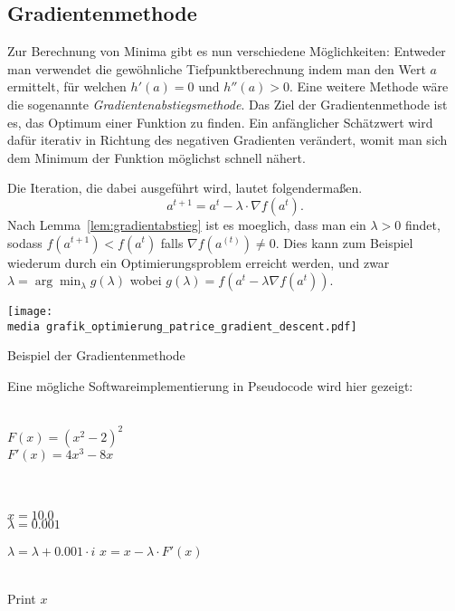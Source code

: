 \subsection{Gradientenmethode}

Zur Berechnung von Minima gibt es nun verschiedene Möglichkeiten:
Entweder man verwendet die gewöhnliche Tiefpunktberechnung indem man den Wert $a$ 
ermittelt, f\"ur welchen $h'(a)=0$ und $h''(a)>0$. 
Eine weitere Methode w\"are die sogenannte \emph{Gradientenabstiegsmethode}. Das Ziel der Gradientenmethode ist es, das Optimum einer Funktion zu finden. Ein anfänglicher Schätzwert wird dafür iterativ in Richtung des negativen Gradienten 
ver\"andert, womit man sich dem Minimum der Funktion möglichst schnell n\"ahert.

Die Iteration, die dabei ausgef\"uhrt wird, lautet folgenderma\ss en. 
\begin{equation*}
a^{t+1}  =a^{t} - \lambda \cdot \nabla  f(a^{t}).
\end{equation*}
Nach Lemma~\ref{lem:gradientabstieg} ist es moeglich, dass man ein $\lambda > 0$ findet, sodass $f(a^{t+1}) < f(a^{t})$ falls $ \nabla f(a^{(t)}) \neq 0$. 
Dies kann zum Beispiel wiederum durch ein Optimierungsproblem erreicht werden, und zwar $\lambda=\arg\min_{\lambda} g(\lambda)$ wobei $g(\lambda)=f(a^t-\lambda\nabla f(a^t))$.




\begin{dsafigure}
\begin{center}
\texttt{[image: \\media grafik\_optimierung\_patrice\_gradient\_descent.pdf]}
\label{figure:grafik_optimierung_patrice_gradient_descent}
\caption{Beispiel der Gradientenmethode}
\end{center}
\end{dsafigure}

Eine mögliche Softwareimplementierung in Pseudocode wird hier gezeigt:

\begin{algorithmic}[1]

   \\$F(x) = (x^2-2)^2$
\\$F'(x) = 4x^3-8x$

\\
\\$x = 10.0$
\\$\lambda = 0.001$

 \State $\lambda = \lambda+0.001\cdot i$
    \State $x = x - \lambda \cdot F'(x)$
  \EndFor
\EndFor
 
 
\\Print $x$\EndProcedure
\Statex
\end{algorithmic}

